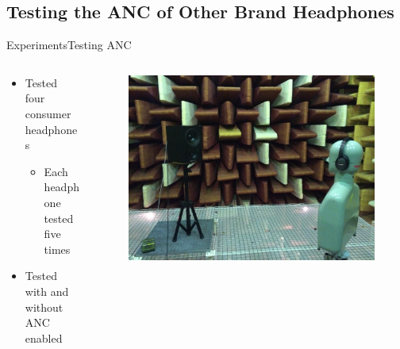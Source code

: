 \subsection{Testing the ANC of Other Brand Headphones}
\begin{frame}{Experiments}{Testing ANC}		
	\begin{columns}
		\begin{column}{0.5\textwidth}
			\begin{itemize}
				\item Tested four consumer headphones
					\begin{itemize}
						\item Each headphone tested five times
					\end{itemize}
				\item Tested with and without ANC enabled
			\end{itemize}
		\end{column}
		\begin{column}{0.5\textwidth} 				
			\begin{figure}[h]
				\includegraphics[width=1\textwidth]{figures/OtherBrandsSetupSide.jpg}
			\end{figure}
		\end{column}
	\end{columns}
\end{frame}










